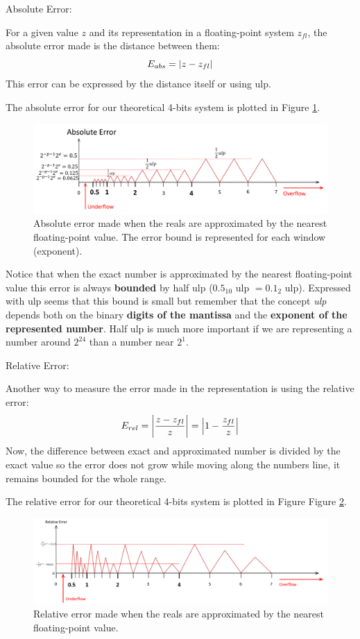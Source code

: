 {\large Absolute Error:}

For a given value $z$ and its representation in a floating-point system $z_{fl}$, 
the absolute error made is the distance between them:
$$
E_{abs} = \abs{z - z_{fl}} 
$$
This error can be expressed by the distance itself or using ulp.

The absolute error for our theoretical 4-bits system is plotted in Figure \ref{fig:AbsErrorGraph}.
\begin{figure}[h]
    \centering
    \includegraphics[width= \textwidth]{./doc/Figures/AbsErrorGraph.png}
    \caption{Absolute error made when the reals are approximated by the nearest floating-point value. The error bound is represented for each window (exponent).}
    \label{fig:AbsErrorGraph}
\end{figure}

Notice that when the exact number is approximated by the nearest floating-point value 
this error is always \textbf{bounded} by half ulp ($0.5_{10}$ ulp $= 0.1_2$ ulp). 
Expressed with ulp seems that this bound is small but remember that the concept \textit{ulp} depends both on 
the binary \textbf{digits of the mantissa} and the \textbf{exponent of the represented number}.
Half ulp is much more important if we are representing a number around $2^{24}$ than a number near $2^1$.






{\large Relative Error:}

Another way to measure the error made in the representation is using the relative error:
$$
E_{rel} = \abs{\frac{z - z_{fl}}{z}} = \abs{1 - \frac{z_{fl}}{z}}
$$
Now, the difference between exact and approximated number is divided by the exact value so
the error does not grow while moving along the numbers line, 
it remains bounded for the whole range. 

The relative error for our theoretical 4-bits system is plotted in Figure Figure \ref{fig:RelErrorGraph}.
\begin{figure}[h]
    \centering
    \includegraphics[width= \textwidth]{./doc/Figures/RelErrorGraph.png}
    \caption{Relative error made when the reals are approximated by the nearest floating-point value.}
    \label{fig:RelErrorGraph}
\end{figure}








